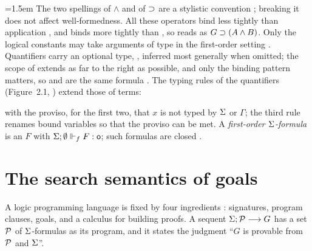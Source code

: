 {\emergencystretch=1.5em
The two spellings of $\wedge$ and of $\supset$ are a stylistic convention ; breaking it does not
affect well-formedness. All these operators bind less tightly than application , and \lp{&}
binds more tightly than \lp{:-} , so  reads as $G\supset(A\wedge B)$. Only the
logical constants may take arguments of type  in the first-order setting . Quantifiers carry an optional type, , inferred most generally when
omitted; the scope of  extends as far to the right as possible, and only the binding pattern
matters, so  and
 are the same formula . The typing rules
of the quantifiers (Figure~2.1, ) extend those of terms:
with the proviso, for the first two, that $x$ is not typed by $\Sigma$ or $\Gamma$; the third rule renames
bound variables so that the proviso can be met. A \emph{first-order $\Sigma$-formula} is an $F$ with
$\Sigma;\emptyset\Vdash_f F:\mathsf{o}$; such formulas are closed .\par}

\section{The search semantics of goals}\label{sec:horn-search}

A logic programming language is fixed by four ingredients : signatures, program clauses, goals, and
a calculus for building proofs. A sequent $\Sigma;\mathcal{P}\longrightarrow G$ has a set $\mathcal{P}$ of $\Sigma$-formulas as its
program, and it states the judgment ``$G$ is provable from $\mathcal{P}$ and $\Sigma$''.

